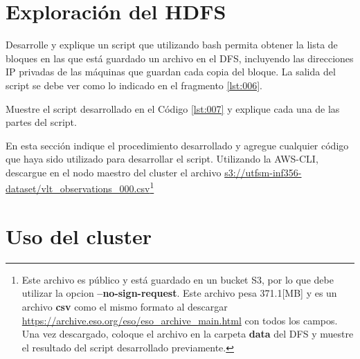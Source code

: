 \documentclass[12pt,letterpaper,twoside]{article}
\begin{document}
\begin{code}[H]

\end{code}

\section{Exploración del HDFS}

{\color{red} Desarrolle y explique un script que utilizando bash permita obtener la lista de bloques en las que está guardado un archivo en el DFS, incluyendo las direcciones IP privadas de las máquinas que guardan cada copia del bloque. La salida del script se debe ver como lo indicado en el fragmento \ref{lst:006}.}

\begin{code}[H]

\end{code}

{\color{red} Muestre el script desarrollado en el Código \ref{lst:007} y explique cada una de las partes del script.}

\begin{code}[H]
    
    \end{code}

{\color{red} En esta sección indique el procedimiento desarrollado y agregue cualquier código que haya sido utilizado para desarrollar el script.}
{\color{red} Utilizando la AWS-CLI, descargue en el nodo maestro del cluster el archivo \url{s3://utfsm-inf356-dataset/vlt_observations_000.csv}}\footnote{Este archivo es público y está guardado en un bucket S3, por lo que debe utilizar la opcion \textbf{--no-sign-request}. Este archivo pesa 371.1[MB] y es un archivo \textbf{csv} como el mismo formato al descargar \url{https://archive.eso.org/eso/eso_archive_main.html} con todos los campos. Una vez descargado, coloque el archivo en la carpeta \textbf{data} del DFS y muestre el resultado del script desarrollado previamente.}

\section{Uso del cluster}
\end{document}
